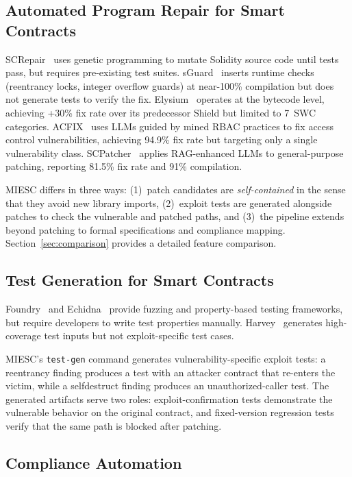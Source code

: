 \documentclass[conference]{IEEEtran}
\begin{document}
\subsection{Automated Program Repair for Smart Contracts}

SCRepair~\cite{screpair2020} uses genetic programming to mutate Solidity source code until tests pass, but requires pre-existing test suites. sGuard~\cite{nguyen2021sguard} inserts runtime checks (reentrancy locks, integer overflow guards) at near-100\% compilation but does not generate tests to verify the fix. Elysium~\cite{elysium2022} operates at the bytecode level, achieving +30\% fix rate over its predecessor Shield but limited to 7~SWC categories. ACFIX~\cite{acfix2024} uses LLMs guided by mined RBAC practices to fix access control vulnerabilities, achieving 94.9\% fix rate but targeting only a single vulnerability class. SCPatcher~\cite{scpatcher2025} applies RAG-enhanced LLMs to general-purpose patching, reporting 81.5\% fix rate and 91\% compilation.

MIESC differs in three ways: (1)~patch candidates are \emph{self-contained} in the sense that they avoid new library imports, (2)~exploit tests are generated alongside patches to check the vulnerable and patched paths, and (3)~the pipeline extends beyond patching to formal specifications and compliance mapping. Section~\ref{sec:comparison} provides a detailed feature comparison.

\subsection{Test Generation for Smart Contracts}

Foundry~\cite{foundry2025} and Echidna~\cite{grieco2020echidna} provide fuzzing and property-based testing frameworks, but require developers to write test properties manually. Harvey~\cite{harvey2020} generates high-coverage test inputs but not exploit-specific test cases.

MIESC's \texttt{test-gen} command generates vulnerability-specific exploit tests: a reentrancy finding produces a test with an attacker contract that re-enters the victim, while a selfdestruct finding produces an unauthorized-caller test. The generated artifacts serve two roles: exploit-confirmation tests demonstrate the vulnerable behavior on the original contract, and fixed-version regression tests verify that the same path is blocked after patching.

\subsection{Compliance Automation}
\end{document}
